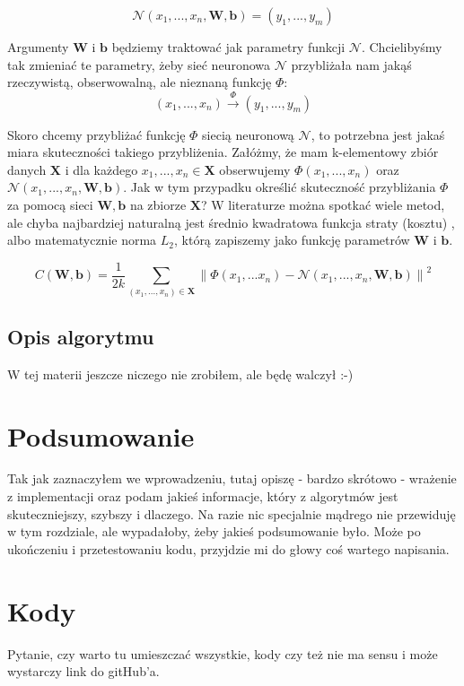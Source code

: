 \documentclass[licencjacka]{pracamgr}
\newcommand{\norm}[1]{\left\lVert#1\right\rVert}
\begin{document}
$$\mathcal{N}(x_{1},...,x_{n}, \mathbf{W}, \mathbf{b}) = (y_{1},...,y_{m})$$

Argumenty $\mathbf{W}$  i $\mathbf{b}$ będziemy traktować jak parametry funkcji $\mathbf{\mathcal{N}}$. Chcielibyśmy tak zmieniać te parametry, żeby sieć neuronowa $\mathbf{\mathcal{N}}$ przybliżała nam jakąś rzeczywistą, obserwowalną, ale nieznaną funkcję $\Phi$: 
$$ (x_{1},...,x_{n})\stackrel{\Phi}{\rightarrow}(y_{1},...,y_{m})$$

Skoro chcemy przybliżać funkcję $\Phi$ siecią neuronową $\mathbf{\mathcal{N}}$, to potrzebna jest jakaś miara skuteczności takiego przybliżenia.  Załóżmy, że mam k-elementowy zbiór danych $\mathbf{X}$ i dla każdego  $x_{1},...,x_{n}\in\mathbf{X}$ obserwujemy $\Phi(x_{1},...,x_{n})$ oraz $\mathbf{\mathcal{N}}(x_{1},...,x_{n}, \mathbf{W}, \mathbf{b})$. Jak w tym przypadku określić skuteczność przybliżania $\Phi$ za pomocą sieci $\mathbf{W}, \mathbf{b}$ na zbiorze $\mathbf{X}$? W literaturze można spotkać wiele metod, ale chyba najbardziej naturalną jest średnio kwadratowa funkcja straty (kosztu) , albo matematycznie norma $L_{2}$, którą zapiszemy jako funkcję parametrów $\mathbf{W}$ i $\mathbf{b}$.

$$C(\mathbf{W}, \mathbf{b}) = \frac{1}{2k}\sum_{(x_{1},...,x_{n})\in\mathbf{X}}{\norm{\Phi(x_{1},...x_{n}) - \mathbf{\mathcal{N}}(x_{1},...,x_{n}, \mathbf{W}, \mathbf{b} )}  } ^{2}$$

\section{Opis algorytmu}
W tej materii jeszcze niczego nie zrobiłem, ale będę walczył :-)

\chapter{Podsumowanie}

Tak jak zaznaczyłem we wprowadzeniu, tutaj opiszę - bardzo skrótowo - wrażenie z implementacji oraz podam jakieś informacje, który z algorytmów jest skuteczniejszy, szybszy i dlaczego. Na razie nic specjalnie mądrego nie przewiduję w tym rozdziale, ale wypadałoby, żeby jakieś podsumowanie było. Może po ukończeniu i przetestowaniu kodu, przyjdzie mi do głowy coś wartego napisania.

\appendix

\chapter{Kody}
Pytanie, czy warto tu umieszczać wszystkie, kody czy też nie ma sensu i może wystarczy link do gitHub'a.
\end{document}
